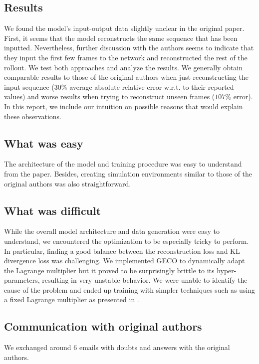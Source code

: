 \subsection*{Results}
We found the model's input-output data slightly unclear in the original paper.
First, it seems that the model reconstructs the same sequence that has been inputted.
Nevertheless, further discussion with the authors seems to indicate that they input the first few frames to the network and reconstructed the rest of the rollout.
We test both approaches and analyze the results.
We generally obtain comparable results to those of the original authors when just reconstructing the input sequence ($30\%$ average absolute relative error w.r.t. to their reported values) and worse results when trying to reconstruct unseen frames ($107\%$ error).
In this report, we include our intuition on possible reasons that would explain these observations.


\subsection*{What was easy}
The architecture of the model and training procedure was easy to understand from the paper.
Besides, creating simulation environments similar to those of the original authors was also straightforward. 

\subsection*{What was difficult}
While the overall model architecture and data generation were easy to understand, we encountered the optimization to be especially tricky to perform.
In particular, finding a good balance between the reconstruction loss and KL divergence loss was challenging.
We implemented GECO \cite{geco} to dynamically adapt the Lagrange multiplier but it proved to be surprisingly brittle to its hyper-parameters, resulting in very unstable behavior.
We were unable to identify the cause of the problem and ended up training with simpler techniques such as using a fixed Lagrange multiplier as presented in \cite{beta-vae}.

\subsection*{Communication with original authors}
We exchanged around 6 emails with doubts and answers with the original authors.











